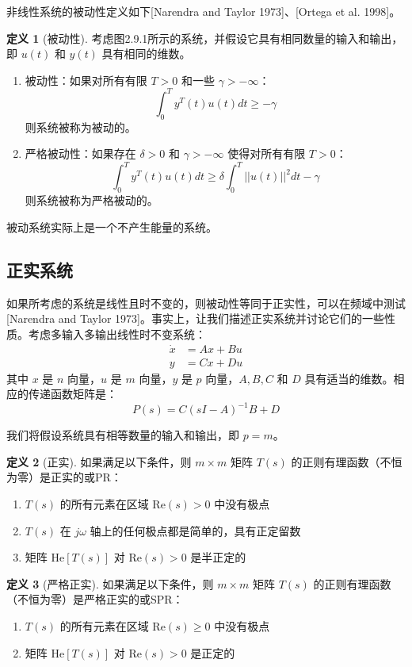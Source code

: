 \documentclass[UTF8,12pt,a4paper]{ctexart}
\theoremstyle{definition}
\newtheorem{definition}{定义}[section]
\begin{document}
非线性系统的被动性定义如下[Narendra and Taylor 1973]、[Ortega et al. 1998]。

\begin{definition}[被动性]
考虑图2.9.1所示的系统，并假设它具有相同数量的输入和输出，即 $u(t)$ 和 $y(t)$ 具有相同的维数。
\begin{enumerate}
\item 被动性：如果对所有有限 $T > 0$ 和一些 $\gamma > -\infty$：
\[
\int_0^T y^T(t)u(t) dt \geq -\gamma
\]
则系统被称为被动的。

\item 严格被动性：如果存在 $\delta > 0$ 和 $\gamma > -\infty$ 使得对所有有限 $T > 0$：
\[
\int_0^T y^T(t)u(t) dt \geq \delta \int_0^T ||u(t)||^2 dt - \gamma
\]
则系统被称为严格被动的。
\end{enumerate}
\end{definition}

被动系统实际上是一个不产生能量的系统。

\subsection{正实系统}

如果所考虑的系统是线性且时不变的，则被动性等同于正实性，可以在频域中测试[Narendra and Taylor 1973]。事实上，让我们描述正实系统并讨论它们的一些性质。考虑多输入多输出线性时不变系统：
\[
\begin{aligned}
\dot{x} &= Ax + Bu \\
y &= Cx + Du
\end{aligned}
\]
其中 $x$ 是 $n$ 向量，$u$ 是 $m$ 向量，$y$ 是 $p$ 向量，$A, B, C$ 和 $D$ 具有适当的维数。相应的传递函数矩阵是：
\[
P(s) = C(sI-A)^{-1}B + D
\]

我们将假设系统具有相等数量的输入和输出，即 $p=m$。

\begin{definition}[正实]
如果满足以下条件，则 $m \times m$ 矩阵 $T(s)$ 的正则有理函数（不恒为零）是正实的或PR：
\begin{enumerate}
\item $T(s)$ 的所有元素在区域 $\text{Re}(s) > 0$ 中没有极点
\item $T(s)$ 在 $j\omega$ 轴上的任何极点都是简单的，具有正定留数
\item 矩阵 $\text{He}[T(s)]$ 对 $\text{Re}(s) > 0$ 是半正定的
\end{enumerate}
\end{definition}

\begin{definition}[严格正实]
如果满足以下条件，则 $m \times m$ 矩阵 $T(s)$ 的正则有理函数（不恒为零）是严格正实的或SPR：
\begin{enumerate}
\item $T(s)$ 的所有元素在区域 $\text{Re}(s) \geq 0$ 中没有极点
\item 矩阵 $\text{He}[T(s)]$ 对 $\text{Re}(s) > 0$ 是正定的
\end{enumerate}
\end{definition}
\end{document}
